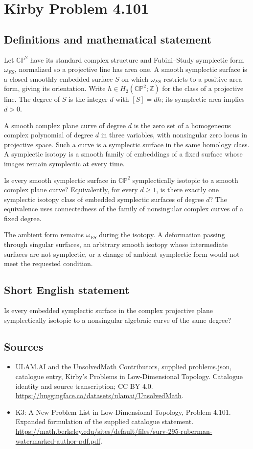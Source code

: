 \documentclass[11pt,a4paper]{article}
\begin{document}
\section*{Kirby Problem 4.101}\label{statement}

\subsection{Definitions and mathematical statement}
Let $\mathbb{CP}^2$ have its standard complex structure and
Fubini--Study symplectic form $\omega_{FS}$, normalized so a
projective line has area one. A smooth symplectic surface is a
closed smoothly embedded surface $S$ on which $\omega_{FS}$
restricts to a positive area form, giving its orientation.
Write $h\in H_2(\mathbb{CP}^2;\mathbb Z)$ for the class of
a projective line. The degree of $S$ is the integer $d$ with
$[S]=dh$; its symplectic area implies $d>0$.

A smooth complex plane curve of degree $d$ is the zero set of
a homogeneous complex polynomial of degree $d$ in three variables,
with nonsingular zero locus in projective space. Such a curve is
a symplectic surface in the same homology class.
A symplectic isotopy is a smooth family of embeddings of a fixed
surface whose images remain symplectic at every time.

Is every smooth symplectic surface in $\mathbb{CP}^2$
symplectically isotopic to a smooth complex plane curve?
Equivalently, for every $d\ge1$, is there exactly one symplectic
isotopy class of embedded symplectic surfaces of degree $d$?
The equivalence uses connectedness of the family of nonsingular
complex curves of a fixed degree.

The ambient form remains $\omega_{FS}$ during the isotopy.
A deformation passing through singular surfaces, an arbitrary smooth
isotopy whose intermediate surfaces are not symplectic, or a change
of ambient symplectic form would not meet the requested condition.
\subsection{Short English statement}
Is every embedded symplectic surface in the complex projective plane symplectically isotopic to a nonsingular algebraic curve of the same degree?
\subsection{Sources}
\begin{itemize}
\item[S1] ULAM.AI and the UnsolvedMath Contributors, supplied problems.json, catalogue entry, Kirby's Problems in Low-Dimensional Topology. Catalogue identity and source transcription; CC BY 4.0.
\url{https://huggingface.co/datasets/ulamai/UnsolvedMath}.
\item[S2] K3: A New Problem List in Low-Dimensional Topology, Problem 4.101. Expanded formulation of the supplied catalogue statement.
\url{https://math.berkeley.edu/sites/default/files/surv-295-ruberman-watermarked-author-pdf.pdf}.
\end{itemize}
\end{document}

